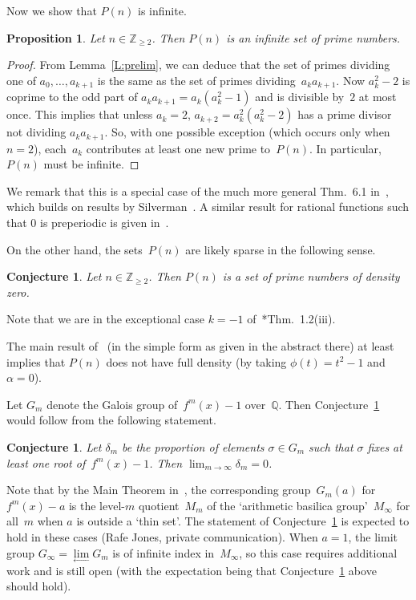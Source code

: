 \documentclass[12pt,a4paper]{amsart}
\newcommand{\Z}{{\mathbb Z}}
\newcommand{\Q}{{\mathbb Q}}
\newtheorem{Proposition}[Theorem]{Proposition}
\newtheorem{Conjecture}[Theorem]{Conjecture}
\theoremstyle{definition}
\numberwithin{equation}{section}
\begin{document}
Now we show that $P(n)$ is infinite.

\begin{Proposition}
  Let $n \in \Z_{\geqslant 2}$. Then $P(n)$ is an infinite set of prime numbers.
\end{Proposition}

\begin{proof}
  From Lemma~\ref{L:prelim}, we can deduce that the set of primes dividing one of
  $a_0, \ldots, a_{k+1}$ is the same as the set of primes dividing~$a_k a_{k+1}$.
  Now $a_k^2 - 2$ is coprime to the odd part of $a_k a_{k+1} = a_k (a_k^2 - 1)$ and is divisible
  by~$2$ at most once. This implies that unless $a_k = 2$, $a_{k+2} = a_k^2 (a_k^2 - 2)$
  has a prime divisor not dividing $a_k a_{k+1}$. So, with one possible exception
  (which occurs only when $n = 2$), each~$a_k$ contributes at least one new prime
  to~$P(n)$. In particular, $P(n)$ must be infinite.
\end{proof}

We remark that this is a special case of the much more general Thm.~6.1
in~\cite{Jones}, which builds on results by Silverman~\cite{SilvermanBook}.
A similar result for rational functions such that $0$ is preperiodic is
given in~\cite{IngramSilverman}.

On the other hand, the sets~$P(n)$ are likely sparse in the following sense.

\begin{Conjecture} \label{Conj1}
  Let $n \in \Z_{\geqslant 2}$. Then $P(n)$ is a set of prime numbers of density zero.
\end{Conjecture}

Note that we are in the exceptional case $k = -1$ of~\cite{Jones}*{Thm.~1.2(iii)}.

The main result of~\cite{BGHKST} (in the simple form as given in the abstract there)
at least implies that $P(n)$ does not have full density (by taking $\phi(t) = t^2 - 1$
and $\alpha = 0$).

Let $G_m$ denote the Galois group of~$f^m(x) - 1$ over~$\Q$. Then Conjecture~\ref{Conj1}
would follow from the following statement.

\begin{Conjecture} \label{Conj2}
  Let $\delta_m$ be the proportion of elements $\sigma \in G_m$ such that $\sigma$
  fixes at least one root of~$f^m(x) - 1$. Then $\lim_{m \to \infty} \delta_m = 0$.
\end{Conjecture}

Note that by the Main Theorem in~\cite{ABCCF}, the corresponding group~$G_m(a)$ for
$f^m(x) - a$ is the level-$m$ quotient~$M_m$ of the `arithmetic basilica group'~$M_\infty$
for all~$m$ when $a$ is outside a `thin set'. The statement of Conjecture~\ref{Conj2}
is expected to hold in these cases (Rafe Jones, private communication). When $a = 1$, the
limit group $G_\infty = \lim\limits_{\longleftarrow} G_m$ is of infinite index in~$M_\infty$,
so this case requires additional work and is still open (with the expectation
being that Conjecture~\ref{Conj2} above should hold).
\end{document}
